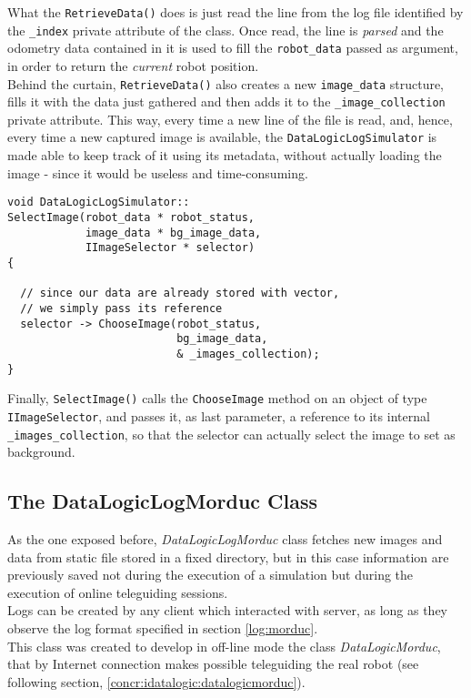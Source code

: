 What the \texttt{RetrieveData()} does is just read the line from the log 
file identified by the \texttt{\_index} private attribute of the class.
Once read, the line is \textit{parsed} and the odometry data contained 
in it is used to fill the \texttt{robot\_data} passed as argument, in 
order to return the \textit{current} robot position.
\\
Behind the curtain, \texttt{RetrieveData()} also creates a new 
\texttt{image\_data} structure, fills it with the data just 
gathered and then adds it to the \texttt{\_image\_collection} 
private attribute.
This way, every time a new line of the file is read, and, hence, 
every time a new captured image is available, the \texttt{DataLogicLogSimulator} 
is made able to keep track of it using its metadata, without actually 
loading the image - since it would be useless and time-consuming.

\begin{lstlisting}[caption={\texttt{DataLogicLogSimulator::SelectImage()} method},
    label={code:datalogiclogsimulator:selectimage}, frame=trBL]
void DataLogicLogSimulator::
SelectImage(robot_data * robot_status,
            image_data * bg_image_data,
            IImageSelector * selector)
{

  // since our data are already stored with vector,
  // we simply pass its reference
  selector -> ChooseImage(robot_status, 
                          bg_image_data, 
                          & _images_collection);
}
\end{lstlisting}

Finally, \texttt{SelectImage()} calls the \texttt{ChooseImage} method 
on an object of type \texttt{IImageSelector}, and passes it, as last 
parameter, a reference to its internal \texttt{\_images\_collection}, 
so that the selector can actually select the image to set as 
background.


\subsection{The DataLogicLogMorduc Class}
\label{concr:idatalogic:datalogiclogmorduc}

As the one exposed before, \textit{DataLogicLogMorduc} class
fetches new images and data from static file
stored in a fixed directory, but in this case information are previously saved
not during the execution of a simulation but during
the execution of online teleguiding sessions.
\\
Logs can be created by any client which interacted with \morduc{}
server, as long as they observe the log format specified in section
\ref{log:morduc}.
\\
This class was created to develop in off-line mode the class
\textit{DataLogicMorduc}, that by Internet connection makes possible
teleguiding the real robot (see following section,
\ref{concr:idatalogic:datalogicmorduc}).

